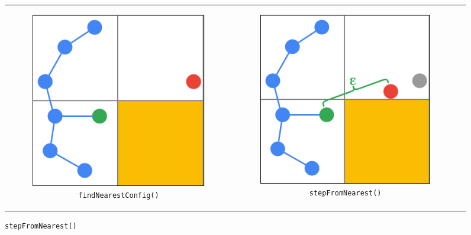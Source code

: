\begin{figure}[t!]
\begin{centering}
\begin{tabular}{ccc}
    \begin{subfigure}{0.3\linewidth}
    \includegraphics[width=\linewidth]{chapters/chapter2/img/keyfunctions/functions2.png}
    \caption{\texttt{findNearestConfig()}}
    \label{rrt_functions_b}
    \end{subfigure} &

    \begin{subfigure}{0.3\linewidth}
    \includegraphics[width=\linewidth]{chapters/chapter2/img/keyfunctions/functions3.png}
    \caption{\texttt{stepFromNearest()}}
    \label{rrt_functions_c}
    \end{subfigure} \\


\end{tabular}
\end{centering}
\end{figure}
